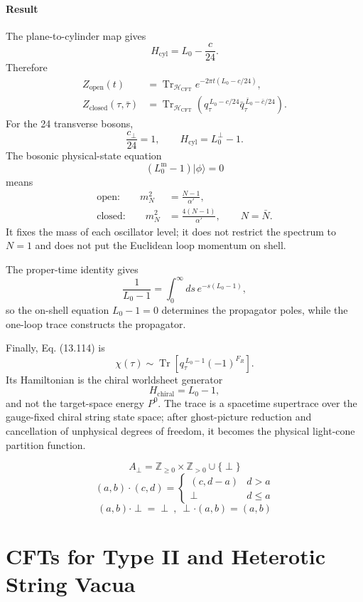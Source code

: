 \documentclass[
  10pt,
  a4paper,
  openany]{book}
\begin{document}
\subsubsection{Result}\label{result-20}

The plane-to-cylinder map gives \[
\boxed{
H_{\mathrm{cyl}}=L_0-\frac{c}{24}.
}
\] Therefore \[
\boxed{
\begin{aligned}
Z_{\mathrm{open}}(t)
&=
\operatorname{Tr}_{\mathcal H_{\mathrm{CFT}}}
e^{-2\pi t(L_0-c/24)},\\%
Z_{\mathrm{closed}}(\tau,\bar\tau)
&=
\operatorname{Tr}_{\mathcal H_{\mathrm{CFT}}}
\left(
q_\tau^{\,L_0-c/24}
\bar q_\tau^{\,\bar L_0-\bar c/24}
\right).
\end{aligned}
}
\] For the 24 transverse bosons, \[
\frac{c_\perp}{24}=1,
\qquad
H_{\mathrm{cyl}}=L_0^\perp-1.
\] The bosonic physical-state equation \[
(L_0^{\mathrm m}-1)|\phi\rangle=0
\] means \[
\boxed{
\begin{aligned}
\text{open:}\qquad
m_N^2&=\frac{N-1}{\alpha'},\\%
\text{closed:}\qquad
m_N^2&=\frac{4(N-1)}{\alpha'},
\qquad N=\bar N.
\end{aligned}
}
\] It fixes the mass of each oscillator level; it does not restrict the
spectrum to \(N=1\) and does not put the Euclidean loop momentum on
shell.

The proper-time identity gives \[
\boxed{
\frac{1}{L_0-1}
=
\int_0^\infty ds\,e^{-s(L_0-1)},
}
\] so the on-shell equation \(L_0-1=0\) determines the propagator poles,
while the one-loop trace constructs the propagator.

Finally, Eq. (13.114) is \[
\boxed{
\chi(\tau)
\sim
\operatorname{Tr}
\left[
q_\tau^{\,L_0-1}(-1)^{F_R}
\right].
}
\] Its Hamiltonian is the chiral worldsheet generator \[
\boxed{
H_{\mathrm{chiral}}=L_0-1,
}
\] and not the target-space energy \(P^0\). The trace is a spacetime
supertrace over the gauge-fixed chiral string state space; after
ghost-picture reduction and cancellation of unphysical degrees of
freedom, it becomes the physical light-cone partition function.

\[
A_{\perp}=\mathbb{Z}_{\geq 0}\times \mathbb{Z}_{>0}\cup \{ \perp \}
\] \[
(a,b)\cdot(c,d)=\left\{\begin{array}{ll}
(c,d-a) & d>a \\
\perp & d\leq a
\end{array}
\right.
\] \[
(a,b)\cdot \perp=\perp \ , \ \perp\cdot(a,b)=(a,b)
\]

\chapter{CFTs for Type II and Heterotic String
Vacua}\label{cfts-for-type-ii-and-heterotic-string-vacua-1}
\end{document}

